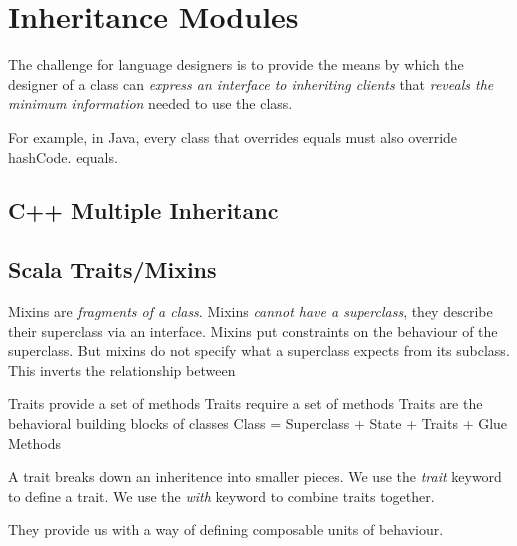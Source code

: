 
\chapter{Inheritance Modules}

The challenge for language designers is to provide the means by which the designer 
of a class can  \textit{express an interface to inheriting clients} 
that \textit{reveals the minimum information} needed to use the class.



For example, in Java, every class that overrides equals must also override hashCode.
equals.


\section{C++ Multiple Inheritanc}









\section{Scala Traits/Mixins}


Mixins are \textit{fragments of a class}.
Mixins \textit{cannot have a superclass}, they describe their superclass via an 
interface. Mixins put constraints on the behaviour of the superclass. 
But mixins do not specify what a superclass expects
from its subclass. This inverts the relationship between 

Traits provide a set of methods 
Traits require a set of methods
Traits are the behavioral building blocks of classes
Class = Superclass + State + Traits + Glue Methods

A trait breaks down an inheritence into smaller pieces.
We use the \textit{trait} keyword to define a trait.
We use the \textit{with} keyword to combine traits together. 

They provide us with a way of defining composable units of behaviour.


